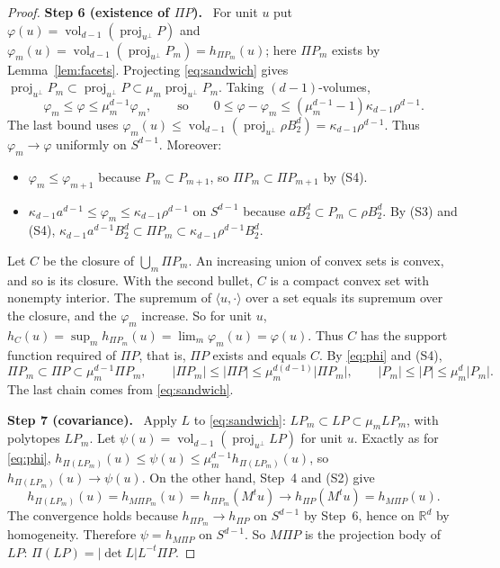 \documentclass[11pt]{article}
\newcommand{\R}{\mathbb R}
\DeclareMathOperator{\vol}{vol}
\DeclareMathOperator{\proj}{proj}
\newcommand{\step}[1]{\par\smallskip\noindent\textbf{#1}\ }
\begin{document}
\begin{proof}
\step{Step 6 (existence of \(\Pi P\)).} For unit \(u\) put
\(\varphi(u)=\vol_{d-1}(\proj_{u^\perp}P)\) and
\(\varphi_m(u)=\vol_{d-1}(\proj_{u^\perp}P_m)=h_{\Pi P_m}(u)\); here
\(\Pi P_m\) exists by Lemma~\ref{lem:facets}. Projecting
\eqref{eq:sandwich} gives
\(\proj_{u^\perp}P_m\subset\proj_{u^\perp}P\subset
\mu_m\proj_{u^\perp}P_m\). Taking \((d-1)\)-volumes,
\begin{equation}\label{eq:phi}
 \varphi_m\le\varphi\le\mu_m^{d-1}\varphi_m,
 \qquad\text{so}\qquad
 0\le\varphi-\varphi_m
 \le(\mu_m^{d-1}-1)\kappa_{d-1}\rho^{d-1}.
\end{equation}
The last bound uses
\(\varphi_m(u)\le\vol_{d-1}(\proj_{u^\perp}\rho B_2^d)
=\kappa_{d-1}\rho^{d-1}\).
Thus \(\varphi_m\to\varphi\) uniformly on \(S^{d-1}\). Moreover:
\begin{itemize}[leftmargin=2em,itemsep=2pt]
\item \(\varphi_m\le\varphi_{m+1}\) because \(P_m\subset P_{m+1}\), so
 \(\Pi P_m\subset\Pi P_{m+1}\) by (S4).
\item \(\kappa_{d-1}a^{d-1}\le\varphi_m\le\kappa_{d-1}\rho^{d-1}\) on
 \(S^{d-1}\) because \(aB_2^d\subset P_m\subset\rho B_2^d\). By (S3) and
 (S4),
 \(\kappa_{d-1}a^{d-1}B_2^d\subset\Pi P_m
 \subset\kappa_{d-1}\rho^{d-1}B_2^d\).
\end{itemize}
Let \(C\) be the closure of \(\bigcup_m\Pi P_m\). An increasing union of
convex sets is convex, and so is its closure. With the second bullet, \(C\)
is a compact convex set with nonempty interior. The supremum of
\(\langle u,\cdot\rangle\) over a set equals its supremum over the closure,
and the \(\varphi_m\) increase. So for unit \(u\),
\(h_C(u)=\sup_mh_{\Pi P_m}(u)=\lim_m\varphi_m(u)=\varphi(u)\). Thus \(C\)
has the support function required of \(\Pi P\), that is, \(\Pi P\) exists
and equals \(C\). By \eqref{eq:phi} and (S4),
\begin{equation}\label{eq:volsandwich}
 \Pi P_m\subset\Pi P\subset\mu_m^{d-1}\Pi P_m,
 \qquad
 |\Pi P_m|\le|\Pi P|\le\mu_m^{d(d-1)}|\Pi P_m|,
 \qquad
 |P_m|\le|P|\le\mu_m^d|P_m|.
\end{equation}
The last chain comes from \eqref{eq:sandwich}.

\step{Step 7 (covariance).} Apply \(L\) to \eqref{eq:sandwich}:
\(LP_m\subset LP\subset\mu_mLP_m\), with polytopes \(LP_m\). Let
\(\psi(u)=\vol_{d-1}(\proj_{u^\perp}LP)\) for unit \(u\). Exactly as for
\eqref{eq:phi},
\(h_{\Pi(LP_m)}(u)\le\psi(u)\le\mu_m^{d-1}h_{\Pi(LP_m)}(u)\), so
\(h_{\Pi(LP_m)}(u)\to\psi(u)\). On the other hand, Step~4 and (S2) give
\[
 h_{\Pi(LP_m)}(u)=h_{M\Pi P_m}(u)=h_{\Pi P_m}(M^tu)
 \longrightarrow h_{\Pi P}(M^tu)=h_{M\Pi P}(u).
\]
The convergence holds because \(h_{\Pi P_m}\to h_{\Pi P}\) on \(S^{d-1}\)
by Step~6, hence on \(\R^d\) by homogeneity. Therefore
\(\psi=h_{M\Pi P}\) on \(S^{d-1}\). So \(M\Pi P\) is the projection body
of \(LP\): \(\Pi(LP)=|\det L|L^{-t}\Pi P\).


\end{proof}
\end{document}
